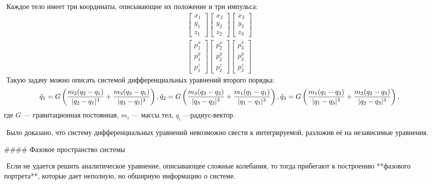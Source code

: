   ​	Каждое тело имеет три координаты, описывающие их положение и три импульса:
  $$
  \begin{matrix}
  \begin{bmatrix}
  x_1\\y_1\\z_1
  \end{bmatrix}
  \begin{bmatrix}
  x_2\\y_2\\z_2
  \end{bmatrix}
  \begin{bmatrix}
  x_3\\y_3\\z_3
  \end{bmatrix}
  \\
  \begin{bmatrix}
  p_1^x\\p_1^y\\p_1^z
  \end{bmatrix}
  \begin{bmatrix}
  p_2^x\\p_2^y\\p_2^z
  \end{bmatrix}
  \begin{bmatrix}
  p_3^x\\p_3^y\\p_3^z
  \end{bmatrix}
  \end{matrix}
  $$
  ​	Такую задачу можно описать системой дифференциальных уравнений второго порядка:
  $$
  \ddot q_1 = G\left(\frac{m_2(q_2 - q_1)}{|q_2 - q_1|^3} + \frac{m_3(q_3 - q_1)}{|q_3 - q_1|^3}\right),\\
  \ddot q_2 = G\left(\frac{m_3(q_3 - q_2)}{|q_3 - q_2|^3} + \frac{m_1(q_1 - q_1)}{|q_1 - q_1|^3}\right),\\
  \ddot q_3 = G\left(\frac{m_1(q_1 - q_3)}{|q_1 - q_3|^3} + \frac{m_2(q_2 - q_3)}{|q_2 - q_3|^3}\right),
  $$
  где $G$ — гравитационная постоянная, $m_i$ — массы тел, $q_i$ —радиус-вектор.

  ​	Было доказано, что систему дифференциальных уравнений невозможно свести к интегрируемой, разложив её на независимые уравнения.

#### Фазовое пространство системы

​	Если не удается решить аналитическое уравнение, описывающее сложные колебания, то тогда прибегают к построению **фазового портрета**, которые дает неполную, но обширную информацию о системе.	

